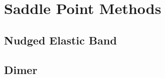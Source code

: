 \section{Saddle Point Methods}
\label{sec:sps}

\placeholder

\subsection{Nudged Elastic Band}
\label{sec:neb}

\placeholder

\subsection{Dimer}
\label{sec:dimer}

\placeholder
